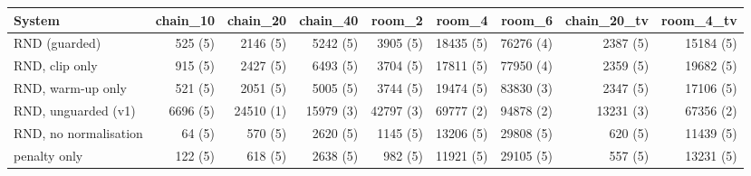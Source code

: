 \begin{tabular}{lrrrrrrrr}
\hline
System & chain\_10 & chain\_20 & chain\_40 & room\_2 & room\_4 & room\_6 & chain\_20\_tv & room\_4\_tv \\
\hline
RND (guarded) & 525 (5) & 2146 (5) & 5242 (5) & 3905 (5) & 18435 (5) & 76276 (4) & 2387 (5) & 15184 (5) \\
RND, clip only & 915 (5) & 2427 (5) & 6493 (5) & 3704 (5) & 17811 (5) & 77950 (4) & 2359 (5) & 19682 (5) \\
RND, warm-up only & 521 (5) & 2051 (5) & 5005 (5) & 3744 (5) & 19474 (5) & 83830 (3) & 2347 (5) & 17106 (5) \\
RND, unguarded (v1) & 6696 (5) & 24510 (1) & 15979 (3) & 42797 (3) & 69777 (2) & 94878 (2) & 13231 (3) & 67356 (2) \\
RND, no normalisation & 64 (5) & 570 (5) & 2620 (5) & 1145 (5) & 13206 (5) & 29808 (5) & 620 (5) & 11439 (5) \\
penalty only & 122 (5) & 618 (5) & 2638 (5) & 982 (5) & 11921 (5) & 29105 (5) & 557 (5) & 13231 (5) \\
\hline
\end{tabular}

